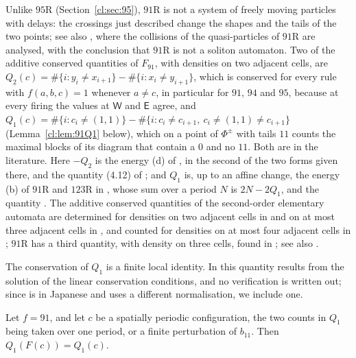 \begin{remark}
Unlike $95$R (Section~\ref{cl:sec:95}), $91$R is not a system of freely moving particles with delays: the crossings just described change the shapes and the tails of the two points; see also \cite[pp.~113--116]{Takesue1997}, where the collisions of the quasi-particles of $91$R are analysed, with the conclusion that $91$R is not a soliton automaton. Two of the additive conserved quantities of $F_{91}$, with densities on two adjacent cells, are $Q_2(c)=\#\{i:y_i\ne x_{i+1}\}-\#\{i:x_i\ne y_{i+1}\}$, which is conserved for every rule with $f(a,b,c)=1$ whenever $a\ne c$, in particular for $91$, $94$ and $95$, because at every firing the values at $\mathsf W$ and $\mathsf E$ agree, and $Q_1(c)=\#\{i:c_i\ne(1,1)\}-\#\{i:c_i\ne c_{i+1},\ c_i\ne(1,1)\ne c_{i+1}\}$ (Lemma~\ref{cl:lem:91Q1} below), which on a point of $\Phi^\pm$ with tails $11$ counts the maximal blocks of its diagram that contain a $0$ and no $11$. Both are in the literature. Here $-Q_2$ is the energy (d) of \cite[Table~IV]{Takesue1989}, in the second of the two forms given there, and the quantity (4.12) of \cite{Takesue1995}; and $Q_1$ is, up to an affine change, the energy (b) of $91$R and $123$R in \cite[Table~IV]{Takesue1989}, whose sum over a period $N$ is $2N-2Q_1$, and the quantity \cite[(40)]{Takesue1997}. The additive conserved quantities of the second-order elementary automata are determined for densities on two adjacent cells in \cite[Table~II]{Takesue1989} and on at most three adjacent cells in \cite[Tables~3--5]{HT1991}, and counted for densities on at most four adjacent cells in \cite[Table~1]{Takesue1997}; $91$R has a third quantity, with density on three cells, found in \cite[Table~4 and p.~321]{HT1991}; see also \cite{Takesue1995}.
\end{remark}

The conservation of $Q_1$ is a finite local identity. In \cite{Takesue1989,HT1991,Takesue1997} this quantity results from the solution of the linear conservation conditions, and no verification is written out; since \cite{Takesue1997} is in Japanese and uses a different normalisation, we include one.

\begin{lemma}\label{cl:lem:91Q1}
Let $f=91$, and let $c$ be a spatially periodic configuration, the two counts in $Q_1$ being taken over one period, or a finite perturbation of $b_{11}$. Then $Q_1(F(c))=Q_1(c)$.
\end{lemma}

